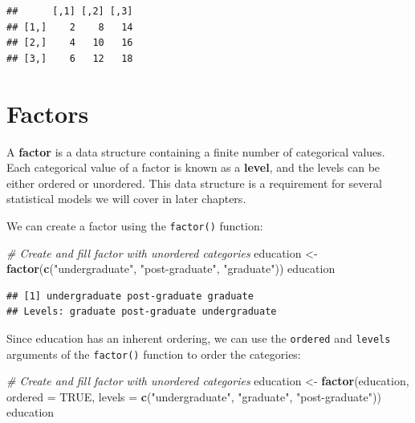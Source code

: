 \documentclass[]{book}
\newenvironment{Shaded}{\begin{snugshade}}{\end{snugshade}}
\newcommand{\CommentTok}[1]{\textcolor[rgb]{0.56,0.35,0.01}{\textit{#1}}}
\newcommand{\DataTypeTok}[1]{\textcolor[rgb]{0.13,0.29,0.53}{#1}}
\newcommand{\KeywordTok}[1]{\textcolor[rgb]{0.13,0.29,0.53}{\textbf{#1}}}
\newcommand{\NormalTok}[1]{#1}
\newcommand{\OtherTok}[1]{\textcolor[rgb]{0.56,0.35,0.01}{#1}}
\newcommand{\StringTok}[1]{\textcolor[rgb]{0.31,0.60,0.02}{#1}}
\begin{document}
\begin{verbatim}
##      [,1] [,2] [,3]
## [1,]    2    8   14
## [2,]    4   10   16
## [3,]    6   12   18
\end{verbatim}

\hypertarget{factors}{%
\section{Factors}\label{factors}}

A \textbf{factor} is a data structure containing a finite number of categorical values. Each categorical value of a factor is known as a \textbf{level}, and the levels can be either ordered or unordered. This data structure is a requirement for several statistical models we will cover in later chapters.

We can create a factor using the \texttt{factor()} function:

\begin{Shaded}
\begin{Highlighting}[]
\CommentTok{# Create and fill factor with unordered categories}
\NormalTok{education <-}\StringTok{ }\KeywordTok{factor}\NormalTok{(}\KeywordTok{c}\NormalTok{(}\StringTok{"undergraduate"}\NormalTok{, }\StringTok{"post-graduate"}\NormalTok{, }\StringTok{"graduate"}\NormalTok{))}
\NormalTok{education}
\end{Highlighting}
\end{Shaded}

\begin{verbatim}
## [1] undergraduate post-graduate graduate     
## Levels: graduate post-graduate undergraduate
\end{verbatim}

Since education has an inherent ordering, we can use the \texttt{ordered} and \texttt{levels} arguments of the \texttt{factor()} function to order the categories:

\begin{Shaded}
\begin{Highlighting}[]
\CommentTok{# Create and fill factor with unordered categories}
\NormalTok{education <-}\StringTok{ }\KeywordTok{factor}\NormalTok{(education, }\DataTypeTok{ordered =} \OtherTok{TRUE}\NormalTok{, }\DataTypeTok{levels =} \KeywordTok{c}\NormalTok{(}\StringTok{"undergraduate"}\NormalTok{, }\StringTok{"graduate"}\NormalTok{, }\StringTok{"post-graduate"}\NormalTok{))}
\NormalTok{education}
\end{Highlighting}
\end{Shaded}
\end{document}
